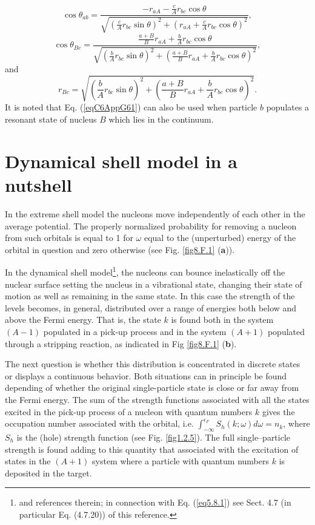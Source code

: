 \begin{equation}\label{eqC6AppG63}
\cos \theta_{ab}=\frac{-r_{aA}-\frac{c}{A}r_{bc}\cos \theta}{\sqrt{\left(\frac{c}{A}r_{bc}\sin \theta\right)^2+\left(r_{aA}+\frac{c}{A}r_{bc}\cos \theta\right)^2}},
\end{equation}
\begin{equation}\label{eqC6AppG64}
\cos \theta_{Bc}=\frac{\frac{a+B}{B}r_{aA}+\frac{b}{A}r_{bc}\cos \theta}{\sqrt{\left(\frac{b}{A}r_{bc}\sin \theta\right)^2+\left(\frac{a+B}{B}r_{aA}+\frac{b}{A}r_{bc}\cos \theta\right)^2}},
\end{equation}
and
\begin{equation}\label{eqC6AppG65}
r_{Bc}=\sqrt{\left(\frac{b}{A}r_{bc}\sin \theta\right)^2+\left(\frac{a+B}{B}r_{aA}+\frac{b}{A}r_{bc}\cos \theta\right)^2}.
\end{equation}
It is noted that Eq. (\ref{eqC6AppG61}) can also be used when particle $b$ populates a resonant state of nucleus $B$ which lies in the continuum.  

\section{Dynamical shell model in a nutshell}\label{C6AppI}
In the extreme shell model the nucleons move independently of each other in  the average potential. The properly normalized probability for removing a nucleon from such orbitals is equal to 1 for $\omega$ equal to the (unperturbed) energy of the orbital in question and zero otherwise (see Fig. \ref{fig8.F.1} (\textbf{a})).

In the dynamical shell model\footnote{\cite{Mahaux:85} and references therein; in connection with Eq. (\ref{eq5.8.1}) see Sect. 4.7 (in particular Eq. (4.7.20)) of this reference.}, the nucleons can bounce inelastically off the nuclear surface setting the nucleus in a vibrational state,  changing their state of motion as well as remaining in the same state. In this case the strength of the levels becomes, in general, distributed over a range of energies both below and above the Fermi energy. That is, the state $k$ is found both in the system $(A-1)$ populated in a pick-up process and in the system $(A+1)$ populated through a stripping reaction, as indicated in Fig \ref{fig8.F.1} (\textbf{b}).



The next question is whether this distribution is concentrated in discrete states or displays a continuous behavior. Both situations can in principle be found depending of whether the original single-particle state is close or far away from the Fermi energy. The sum of the strength functions associated with all the states excited in the pick-up process of a nucleon with quantum numbers $k$ gives the occupation number associated with the orbital, i.e. $\int_{-\infty}^{\epsilon_F}S_{h}(k;\omega)d\omega=n_k$, where $S_h$ is the (hole) strength function (see Fig. \ref{fig1.2.5}). The full single--particle strength is found adding to this quantity that associated with the excitation of states in the $(A+1)$ system where a particle with quantum numbers $k$ is deposited in the target.



